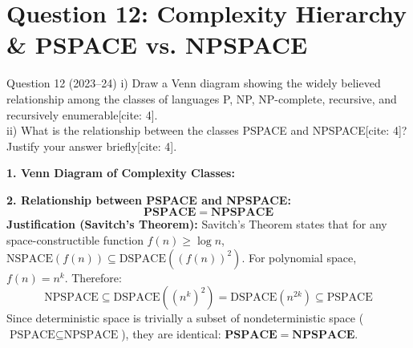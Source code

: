 \documentclass[11pt,a4paper]{article}
\begin{document}
\section{Question 12: Complexity Hierarchy \& PSPACE vs. NPSPACE}
\begin{questionbox}{Question 12 (2023--24)}
i) Draw a Venn diagram showing the widely believed relationship among the classes of languages P, NP, NP-complete, recursive, and recursively enumerable[cite: 4]. \\
ii) What is the relationship between the classes PSPACE and NPSPACE[cite: 4]? Justify your answer briefly[cite: 4].
\end{questionbox}

\begin{solutionbox}
\textbf{1. Venn Diagram of Complexity Classes:}
\begin{center}
\end{center}

\textbf{2. Relationship between PSPACE and NPSPACE:}
$$\mathbf{PSPACE = NPSPACE}$$
\textbf{Justification (Savitch's Theorem):} Savitch's Theorem states that for any space-constructible function $f(n) \ge \log n$, $\text{NSPACE}(f(n)) \subseteq \text{DSPACE}((f(n))^2)$. For polynomial space, $f(n) = n^k$. Therefore:
$$\text{NPSPACE} \subseteq \text{DSPACE}((n^k)^2) = \text{DSPACE}(n^{2k}) \subseteq \text{PSPACE}$$
Since deterministic space is trivially a subset of nondeterministic space ($\text{PSPACE} \subseteq \text{NPSPACE}$), they are identical: $\mathbf{PSPACE = NPSPACE}$.
\end{solutionbox}
\end{document}
